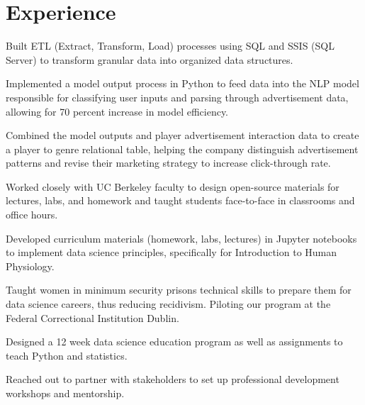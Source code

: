 \documentclass[]{deedy-resume-openfont}
\begin{document}
\begin{minipage}[t]{0.66\textwidth} 


\section{Experience}
\vspace{\topsep} %
\begin{tightemize}
\item Built ETL (Extract, Transform, Load) processes using SQL and SSIS (SQL Server) to transform granular data into organized data structures.
\item Implemented a model output process in Python to feed data into the NLP model responsible for classifying user inputs and parsing through advertisement data, allowing for 70 percent increase in model efficiency.
\item Combined the model outputs and player advertisement interaction data to create a player to genre relational table, helping the company distinguish advertisement patterns and revise their marketing strategy to increase click-through rate.
\end{tightemize}
\sectionsep

\begin{tightemize}
\item Worked closely with UC Berkeley faculty to design open-source materials for lectures, labs, and homework and taught students face-to-face in classrooms and office hours.
\item Developed curriculum materials (homework, labs, lectures) in Jupyter notebooks to implement data science principles, specifically for Introduction to Human Physiology. 
\end{tightemize}
\sectionsep

\begin{tightemize}
\item Taught women in minimum security prisons technical skills to prepare them for data science careers, thus reducing recidivism. Piloting our program at the Federal Correctional Institution Dublin.
\item Designed a 12 week data science education program as well as assignments to teach Python and statistics.
\item Reached out to partner with stakeholders to set up professional development workshops and mentorship.
\end{tightemize}
\sectionsep


\end{minipage}
\end{document}
